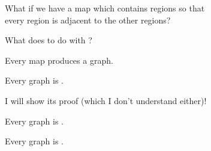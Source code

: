 \begin{frame}{}
  \begin{center}
    What if we have a map which contains  regions so that \\[5pt]
    every region is adjacent to the other  regions?
  \end{center}

  \pause
\end{frame}

\begin{frame}{}
  \begin{center}
    What does  to do with ?
  \end{center}

\end{frame}

\begin{frame}{}

  \pause
  \vspace{0.40cm}
  \begin{center}
    Every map produces a  graph.
  \end{center}
\end{frame}

\begin{frame}{}
  \begin{theorem}
    Every   graph is .
  \end{theorem}


  \pause
  \begin{center}
    I will  show its proof (which I don't understand either)!
  \end{center}
\end{frame}

\begin{frame}{}
  \begin{theorem}
    Every   graph is .
  \end{theorem}

  \pause
  \vspace{1.50cm}
  \begin{theorem}
    Every   graph is .
  \end{theorem}
\end{frame}
